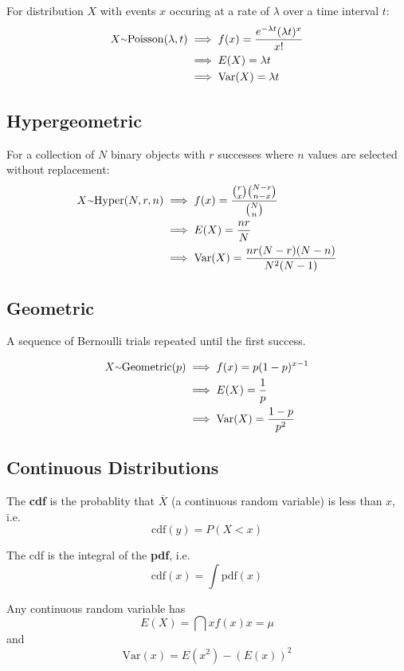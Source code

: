\documentclass[12pt]{article}
\begin{document}
For distribution $X$ with events $x$ occuring at a rate of $\lambda$ over a time interval $t$:
\begin{align*}
X \ttilde \text{Poisson}(\lambda, t) &\implies f(x) = \frac{e^{-\lambda t} (\lambda t)^x}{x!}\\
                                     &\implies E(X) = \lambda t\\
                                     &\implies \text{Var}(X) = \lambda t
\end{align*}

\subsection*{Hypergeometric}
For a collection of $N$ binary objects with $r$ successes where $n$ values are selected without replacement:
\begin{align*}
X \ttilde \text{Hyper}(N, r, n) &\implies f(x) = \frac{{r \choose x} {N-r \choose n-x}}{{N \choose n}}\\
                                &\implies E(X) = \frac{nr}{N}\\
                                &\implies \text{Var}(X) = \frac{nr(N-r)(N-n)}{N^2(N-1)}
\end{align*}

\subsection*{Geometric}
A sequence of Bernoulli trials repeated until the first success.

\begin{align*}
X \ttilde \text{Geometric}(p) &\implies f(x) = p(1-p)^{x-1}\\
                              &\implies E(X) = \frac{1}{p}\\
                              &\implies \text{Var}(X) = \frac{1-p}{p^2}
\end{align*}

\subsection*{Continuous Distributions}
The {\bf cdf} is the probablity that $\overline{X}$ (a continuous random variable) is less than $x$, i.e. \[ \text{cdf}(y) = P(X < x) \]

The cdf is the integral of the {\bf pdf}, i.e. \[ \text{cdf}(x) = \int{\text{pdf}(x)} \]

Any continuous random variable has \[ E(X) = \dint{x}{}{f(x)}{x} = \mu \] and \[ \text{Var}(x) = E(x^2) - (E(x))^2 \]
\end{document}
